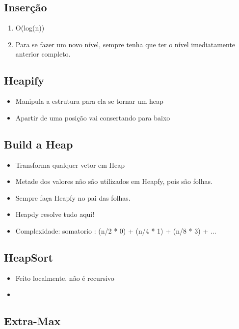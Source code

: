 \documentclass{article}
\begin{document}
\subsection{Inserção}
	\begin{enumerate}
	\item O(log(n))
	\item Para se fazer um novo nível, sempre tenha que ter o nível imediatamente anterior completo.	
	\end{enumerate}
\subsection{Heapify}
	\begin{itemize}
	\item Manipula a estrutura para ela se tornar um heap
	\item Apartir de uma posição vai consertando para baixo
	\end{itemize}
\subsection{Build a Heap}
	\begin{itemize}
	\item Transforma qualquer vetor em Heap
	\item Metade dos valores não são utilizados em Heapfy, pois são folhas.
	\item Sempre faça Heapfy no pai das folhas.
	\item Heapdy resolve tudo aqui!
	\item Complexidade: somatorio : (n/2 * 0) + (n/4 * 1) + (n/8 * 3) + ...
	\end{itemize}
\subsection{HeapSort}
	\begin{itemize}
	\item Feito localmente, não é recursivo
	\item 
	\end{itemize}
\subsection{Extra-Max}
\end{document}
